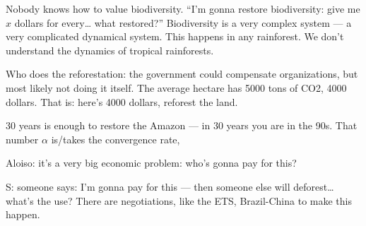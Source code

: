 Nobody knows how to value biodiversity.
``I'm gonna restore biodiversity:
give me $x$ dollars for every… what
restored?''
Biodiversity is a very complex system
--- a very complicated dynamical system.
This happens in any rainforest.
We don't understand the dynamics of
tropical rainforests.

Who does the reforestation: the government
could compensate organizations, but
most likely not doing it itself.
The average hectare has 5000 tons of CO2, 
4000 dollars. That is: here's 4000 dollars,
reforest the land.

30 years is enough to restore the Amazon ---
in 30 years you are in the 90s.
That number $\alpha$ is/takes the convergence
rate,

Aloiso: it's a very big economic
problem: who's gonna pay for this?


S: someone says:
 I'm gonna pay for this --- then someone
else will deforest… what's the use?
There are negotiations, like the ETS,
Brazil-China to make this happen.





